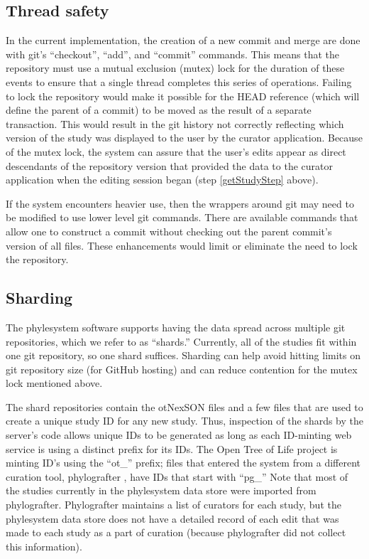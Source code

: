 \documentclass{bioinfo}
\newcommand{\ps}{phylesystem\xspace}
\newcommand{\otol}{Open Tree of Life\xspace}
\newcommand{\nexson}{otNexSON\xspace}
\begin{document}
\begin{methods}
\subsection*{Thread safety}
In the current implementation, the creation of a new commit and merge are done with git's ``checkout'', ``add'', and ``commit'' commands.
This means that the repository must use a mutual exclusion (mutex) lock for the duration of these events
    to ensure that a single thread completes this series of operations.
Failing to lock the repository would make it possible for the HEAD reference (which
    will define the parent of a commit) to be moved as the result of a separate transaction.
This would result in the git history not correctly reflecting which version of the 
    study was displayed to the user by the curator application.
Because of the mutex lock, the system can assure that the user's edits appear
    as direct descendants of the repository version that provided the data to 
    the curator application when the editing session began (step \ref{getStudyStep} above).

If the system encounters heavier use, then the wrappers around git may need to 
    be modified to use lower level git commands.
There are available commands that allow one to construct a commit without checking out
    the parent commit's version of all files.
These enhancements would limit or eliminate the need to lock the repository.
\subsection*{Sharding}
The \ps software supports having the data spread across multiple git repositories, which
    we refer to as ``shards.''
Currently, all of the studies fit within one git repository, so one shard suffices.
Sharding can help avoid hitting limits on git repository size (for GitHub hosting) and can 
    reduce contention for the mutex lock mentioned above.

The shard repositories contain the \nexson files and a few files that are used to 
    create a unique study ID for any new study.
Thus, inspection of the shards by the server's code allows unique IDs to be generated as long as 
    each ID-minting web service is using a distinct prefix for its IDs.
The \otol project is minting ID's using the ``ot\_'' prefix;
    files that entered the system from a different curation tool, phylografter \citep{Phylografter},
    have IDs that start with ``pg\_''
Note that most of the studies currently in the \ps data store were imported from phylografter.
Phylografter maintains a list of curators for each study, but the \ps data store does not
    have a detailed record of each edit that was made to each study as a part of 
    curation (because phylografter did not collect this information).


\end{methods}
\end{document}
